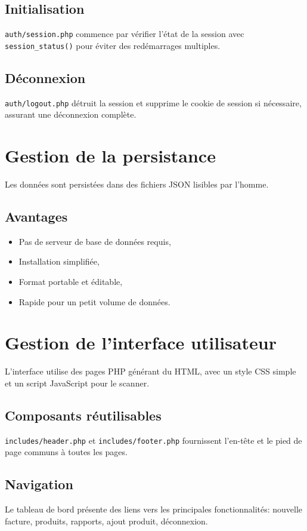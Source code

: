 \documentclass[12pt,a4paper]{article}
\begin{document}
\subsection{Initialisation}
\texttt{auth/session.php} commence par vérifier l'état de la session avec \texttt{session\_status()} pour éviter des redémarrages multiples.

\subsection{Déconnexion}
\texttt{auth/logout.php} détruit la session et supprime le cookie de session si nécessaire, assurant une déconnexion complète.

\section{Gestion de la persistance}
Les données sont persistées dans des fichiers JSON lisibles par l'homme.

\subsection{Avantages}
\begin{itemize}
  \item Pas de serveur de base de données requis,
  \item Installation simplifiée,
  \item Format portable et éditable,
  \item Rapide pour un petit volume de données.
\end{itemize}
\section{Gestion de l'interface utilisateur}
L'interface utilise des pages PHP générant du HTML, avec un style CSS simple et un script JavaScript pour le scanner.

\subsection{Composants réutilisables}
\texttt{includes/header.php} et \texttt{includes/footer.php} fournissent l'en-tête et le pied de page communs à toutes les pages.

\subsection{Navigation}
Le tableau de bord présente des liens vers les principales fonctionnalités: nouvelle facture, produits, rapports, ajout produit, déconnexion.
\end{document}

